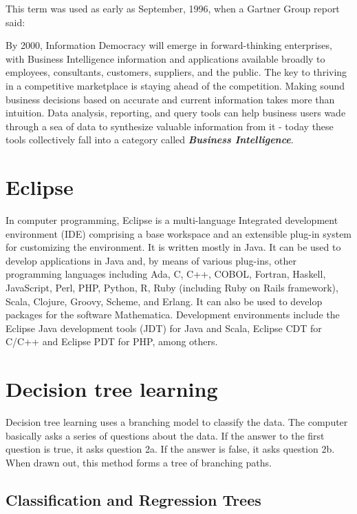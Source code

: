\documentclass[11pt]{article} %
\begin{document}
This term was used as early as September, 1996, when a Gartner Group report said:


By 2000, Information Democracy will emerge in forward-thinking enterprises, with Business Intelligence information and applications available broadly to employees, consultants, customers, suppliers, and the public. The key to thriving in a competitive marketplace is staying ahead of the competition. Making sound business decisions based on accurate and current information takes more than intuition. Data analysis, reporting, and query tools can help business users wade through a sea of data to synthesize valuable information from it - today these tools collectively fall into a category called \textbf{\textit{Business Intelligence}}.


\section{Eclipse}
In computer programming, Eclipse is a multi-language Integrated development environment (IDE) comprising a base workspace and an extensible plug-in system for customizing the environment. It is written mostly in Java. It can be used to develop applications in Java and, by means of various plug-ins, other programming languages including Ada, C, C++, COBOL, Fortran, Haskell, JavaScript, Perl, PHP, Python, R, Ruby (including Ruby on Rails framework), Scala, Clojure, Groovy, Scheme, and Erlang. It can also be used to develop packages for the software Mathematica. Development environments include the Eclipse Java development tools (JDT) for Java and Scala, Eclipse CDT for C/C++ and Eclipse PDT for PHP, among others.



\section{Decision tree learning}

Decision tree learning uses a branching model to classify the data. The computer basically asks a series of questions about the data. If the answer to the first question is true, it asks question 2a. If the answer is false, it asks question 2b. When drawn out, this method forms a tree of branching paths.







\subsection*{Classification and Regression Trees}
\end{document}
